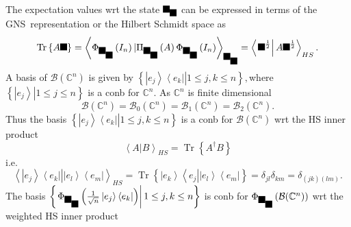 \documentclass[aps,preprint]{revtex4}%
\providecommand{\U}[1]{\protect\rule{.1in}{.1in}}
\begin{document}
The expectation values wrt the state $\U{3c9} _{\U{3c1} }$ can be expressed in
terms of the GNS\ representation or the Hilbert Schmidt space as
\begin{equation}
\operatorname{Tr}\left\{  A\U{3c1} \right\}  =\left\langle \Phi_{\U{3c9}
_{\U{3c1} }}\left(  I_{n}\right)  |\Pi_{\U{3c9} _{\U{3c1} }}\left(  A\right)
\Phi_{\U{3c9} _{\U{3c1} }}\left(  I_{n}\right)  \right\rangle _{\U{3c9}
_{\U{3c1} }}=\left\langle \left.  \U{3c1} ^{\frac{1}{2}}\right\vert A\U{3c1}
^{\frac{1}{2}}\right\rangle _{HS}.
\end{equation}
A basis of $\mathcal{B}(\mathbb{C}^{n})$ is given by $\left\{  \left.
\left\vert e_{j}\right\rangle \left\langle e_{k}\right\vert \right\vert 1\leq
j,k\leq n\right\}  ,$where $\left\{  \left.  \left\vert e_{j}\right\rangle
\right\vert 1\leq j\leq n\right\}  $ is a conb for $\mathbb{C}^{n}.$ As
$\mathbb{C}^{n}$ is finite dimensional
\begin{equation}
\mathcal{B}(\mathbb{C}^{n})=\mathcal{B}_{0}(\mathbb{C}^{n})=\mathcal{B}%
_{1}(\mathbb{C}^{n})=\mathcal{B}_{2}(\mathbb{C}^{n}).
\end{equation}
Thus the basis $\left\{  \left.  \left\vert e_{j}\right\rangle \left\langle
e_{k}\right\vert \right\vert 1\leq j,k\leq n\right\}  $ is a conb for
$\mathcal{B}(\mathbb{C}^{n})$ wrt the HS inner product
\begin{equation}
\left\langle \left.  A\right\vert B\right\rangle _{HS}=\operatorname{Tr}%
\left\{  A^{\dagger}B\right\}
\end{equation}
i.e.
\begin{equation}
\left\langle \left.  \left\vert e_{j}\right\rangle \left\langle e_{k}%
\right\vert \right\vert \left\vert e_{l}\right\rangle \left\langle
e_{m}\right\vert \right\rangle _{HS}=\operatorname{Tr}\left\{  \left\vert
e_{k}\right\rangle \left\langle e_{j}\right\vert \left\vert e_{l}\right\rangle
\left\langle e_{m}\right\vert \right\}  =\delta_{jl}\delta_{km}=\delta
_{\left(  jk\right)  \left(  lm\right)  }.
\end{equation}
The basis $\left\{  \left.  \Phi_{\U{3c9} _{\U{3c1} }}\left(  \frac{1}%
{\sqrt{n}}\left\vert e_{j}\right\rangle \left\langle e_{k}\right\vert \right)
\right\vert 1\leq j,k\leq n\right\}  $ is conb for $\Phi_{\U{3c9} _{\U{3c1} }%
}\left(  \mathcal{B}(\mathbb{C}^{n})\right)  $ wrt the weighted HS inner
product
\end{document}
